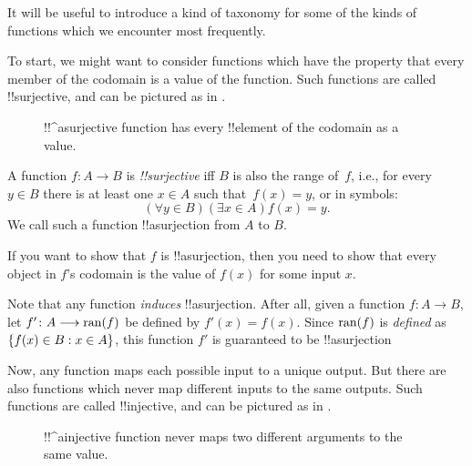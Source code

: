 \documentclass[../../../include/open-logic-section]{subfiles}
\begin{document}

\begin{explain}
It will be useful to introduce a kind of taxonomy for some of the
kinds of functions which we encounter most frequently. 

To start, we might want to consider functions which have the property
that every member of the codomain is a value of the function. Such
functions are called !!{surjective}, and can be pictured as in
.

\begin{figure}
  \caption{!!^a{surjective} function has every !!{element} of the
    codomain as a value.}
\end{figure}
\end{explain}

\begin{defn}
A function $f \colon A \rightarrow B$ is \emph{!!{surjective}} iff $B$
is also the range of~$f$, i.e., for every $y \in B$ there is at least
one $x \in A$ such that~$f(x) = y$, or in symbols:
\[
  (\forall y \in B)(\exists x \in A)f(x) = y.
\]
We call such a function !!a{surjection} from $A$ to $B$.
\end{defn}

\begin{explain}
If you want to show that $f$ is !!a{surjection}, then you need to show
that every object in $f$'s codomain is the value of $f(x)$ for some
input $x$.

Note that any function \emph{induces} !!a{surjection}. After all,
given a function $f \colon A \to B$, let $f' \colon A \longrightarrow \mathrm{ran}(f)$ be
defined by $f'(x) = f(x)$. Since $\mathrm{ran}(f)$ is \emph{defined} as
$\{ f(x) \in B : x \in A \}$, this function $f'$ is guaranteed to be
!!a{surjection}
\end{explain}

\begin{explain}
Now, any function maps each possible input to a unique output. But
there are also functions which never map different inputs to the same
outputs. Such functions are called !!{injective}, and can be pictured
as in .
\begin{figure}
  \caption{!!^a{injective} function never maps two different
    arguments to the same value.}
\end{figure}
\end{explain}
\end{document}
